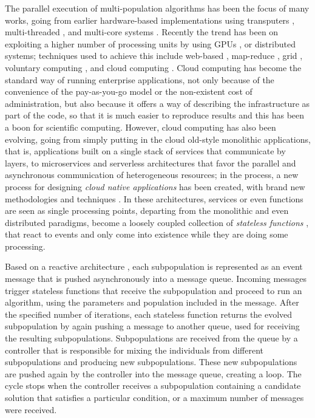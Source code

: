 \documentclass[review]{elsarticle}
\begin{document}
The parallel execution of multi-population algorithms has been the focus of many
works,  going from earlier hardware-based implementations using transputers \cite{gorges1990explicit},
multi-threaded \cite{merelo2019scaling}, and multi-core systems \cite{Serrano2008,lai2019adaptive}. %
Recently the trend has been on exploiting a higher number of processing units 
by using GPUs \cite{tan2015survey,li2007efficient}, or distributed systems; techniques used to achieve this include 
web-based \cite{JSON}, map-reduce \cite{fazenda2012},  grid \cite{munawar2010design,Gonzalez09}, 
voluntary computing \cite{MilkyWay}, and cloud computing 
\cite{GValdez2015,salza2019speed,valenzuela2015implementing,FlexGP}. %
Cloud computing has become the standard way of running enterprise applications, not
only because of the convenience of the pay-as-you-go model or the non-existent
cost of administration, but also because it offers a way of describing the
infrastructure as part of the code, so that it is much easier to reproduce
results and this has been a boon for scientific computing.  However,  cloud computing
has also been evolving, going from simply putting in the cloud old-style monolithic applications, that is,
applications built on a single stack of services that communicate by layers, to
microservices \cite{microservices} and serverless architectures \cite{varghese2018next, Varghese2018849} that favor the parallel and
asynchronous communication of heterogeneous resources; in the process, 
a new process for designing {\em cloud native applications} has been created, 
with brand new methodologies and techniques \cite{Baldini2016287}. In these architectures,
services or even functions are seen as single processing points,  departing
from the monolithic and even distributed paradigms, become a loosely coupled collection of 
{\em stateless functions} \cite{malawski2017serverless}, that react to events and only come into existence while they 
are doing some processing. %

Based on a reactive architecture \cite{guervos2018introducing} , each
subpopulation is represented as an event message that is pushed asynchronously
into a message queue. Incoming messages trigger stateless functions that receive
the subpopulation and proceed to run an algorithm, using the parameters and
population included in the message. After the specified number of iterations,
each stateless function returns the evolved subpopulation by again pushing a
message to another queue, used for receiving the resulting subpopulations.
Subpopulations are received from the queue by a controller that is responsible
for mixing the individuals from different subpopulations and producing new
subpopulations. These new subpopulations are pushed again by the controller into
the message queue, creating a loop. The cycle stops when the controller receives
a subpopulation containing a candidate solution that satisfies a particular
condition, or a maximum number of messages were received.
\end{document}
